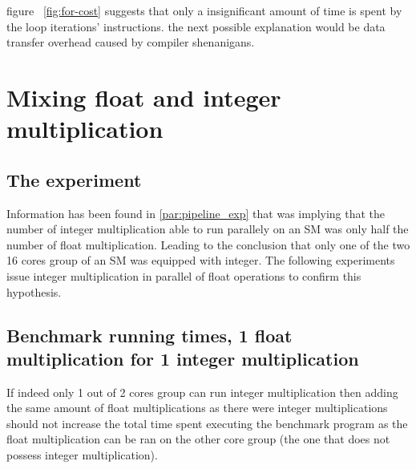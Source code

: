 \documentclass{report}
\begin{document}
    figure ~\ref{fig:for-cost} suggests that only a insignificant amount of time is spent by the loop
    iterations' instructions. the next possible explanation would be data transfer overhead caused
    by compiler shenanigans.

\section{Mixing float and integer multiplication}
	\subsection{The experiment}
	Information has been found in \ref{par:pipeline_exp} that was implying that the number of 
    integer multiplication able to run parallely on an SM was only half the number of 
    float multiplication. Leading to the conclusion that only one of
    the two 16 cores group of an SM was equipped with integer. The following experiments issue 
    integer multiplication in parallel of float operations to confirm this hypothesis.
	\subsection{Benchmark running times, 1 float multiplication for 1 integer multiplication}
	If indeed only 1 out of 2 cores group can run integer multiplication then
    adding the same amount of float multiplications as there were integer
    multiplications should not increase the total time spent executing the benchmark 
    program as the float multiplication can
    be ran on the other core group (the one that does not possess integer multiplication).
	
\end{document}
